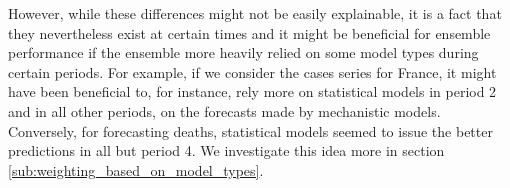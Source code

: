 However, while these differences might not be easily explainable, it is a fact that they nevertheless exist at certain times and it might be beneficial for ensemble performance if the ensemble more heavily relied on some model types during certain periods. For example, if we consider the cases series for France, it might have been beneficial to, for instance, rely more on statistical models in period 2 and in all other periods, on the forecasts made by mechanistic models. Conversely, for forecasting deaths, statistical models seemed to issue the better predictions in all but period 4. We investigate this idea more in section \ref{sub:weighting_based_on_model_types}.

